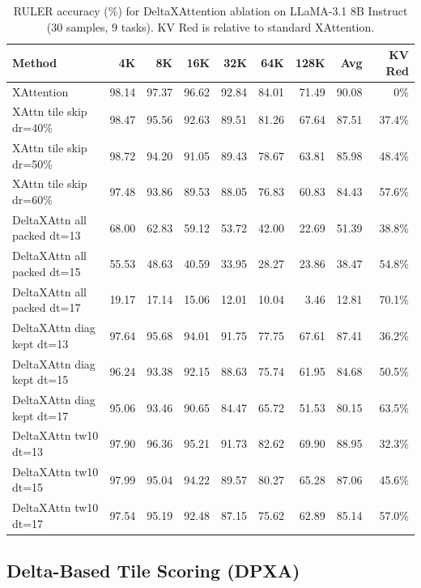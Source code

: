 \begin{table}[!ht]
\centering
\caption{RULER accuracy (\%) for DeltaXAttention ablation on LLaMA-3.1 8B Instruct (30 samples, 9 tasks). KV Red is relative to standard XAttention.}
\label{tab:deltaxattn}
\begin{tabular}{lrrrrrrrr}
\toprule
Method & 4K & 8K & 16K & 32K & 64K & 128K & Avg & KV Red \\
\midrule
XAttention                    & 98.14 & 97.37 & 96.62 & 92.84 & 84.01 & 71.49 & 90.08 & 0\%    \\
\midrule
XAttn tile skip dr=40\%       & 98.47 & 95.56 & 92.63 & 89.51 & 81.26 & 67.64 & 87.51 & 37.4\% \\
XAttn tile skip dr=50\%       & 98.72 & 94.20 & 91.05 & 89.43 & 78.67 & 63.81 & 85.98 & 48.4\% \\
XAttn tile skip dr=60\%       & 97.48 & 93.86 & 89.53 & 88.05 & 76.83 & 60.83 & 84.43 & 57.6\% \\
\midrule
DeltaXAttn all packed dt=13   & 68.00 & 62.83 & 59.12 & 53.72 & 42.00 & 22.69 & 51.39 & 38.8\% \\
DeltaXAttn all packed dt=15   & 55.53 & 48.63 & 40.59 & 33.95 & 28.27 & 23.86 & 38.47 & 54.8\% \\
DeltaXAttn all packed dt=17   & 19.17 & 17.14 & 15.06 & 12.01 & 10.04 &  3.46 & 12.81 & 70.1\% \\
\midrule
DeltaXAttn diag kept dt=13    & 97.64 & 95.68 & 94.01 & 91.75 & 77.75 & 67.61 & 87.41 & 36.2\% \\
DeltaXAttn diag kept dt=15    & 96.24 & 93.38 & 92.15 & 88.63 & 75.74 & 61.95 & 84.68 & 50.5\% \\
DeltaXAttn diag kept dt=17    & 95.06 & 93.46 & 90.65 & 84.47 & 65.72 & 51.53 & 80.15 & 63.5\% \\
\midrule
DeltaXAttn tw10 dt=13         & 97.90 & 96.36 & 95.21 & 91.73 & 82.62 & 69.90 & 88.95 & 32.3\% \\
DeltaXAttn tw10 dt=15         & 97.99 & 95.04 & 94.22 & 89.57 & 80.27 & 65.28 & 87.06 & 45.6\% \\
DeltaXAttn tw10 dt=17         & 97.54 & 95.19 & 92.48 & 87.15 & 75.62 & 62.89 & 85.14 & 57.0\% \\
\bottomrule
\end{tabular}
\end{table}

\subsection{Delta-Based Tile Scoring (DPXA)}
\label{sec:results_delta_tile_scoring}

